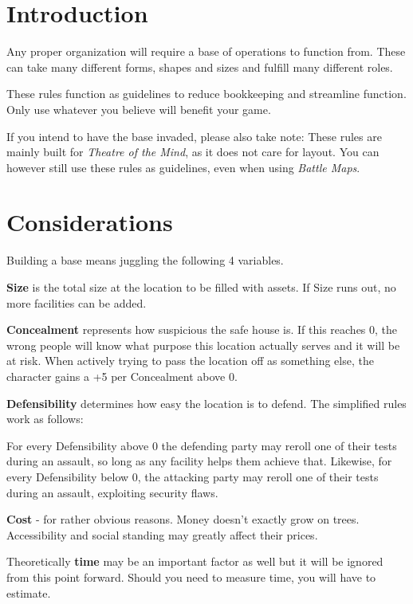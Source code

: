 \documentclass[12pt,a4paper,openany]{book}
\begin{document}
	

	\chapter{Introduction}
	Any proper organization will require a base of operations to function from. These can take many different forms, shapes and sizes and fulfill many different roles.
	\par
	These rules function as guidelines to reduce bookkeeping and streamline function. Only use whatever you believe will benefit your game.
	\par
	If you intend to have the base invaded, please also take note: These rules are mainly built for \emph{Theatre of the Mind}, as it does not care for layout. You can however still use these rules as guidelines, even when using \emph{Battle Maps}.

	\chapter{Considerations}
	Building a base means juggling the following 4 variables.\par
	\textbf{Size} is the total size at the location to be filled with assets. If Size runs out, no more facilities can be added.\par
	\textbf{Concealment} represents how suspicious the safe house is. If this reaches 0, the wrong people will know what purpose this location actually serves and it will be at risk.
	When actively trying to pass the location off as something else, the character gains a +5 per Concealment above 0.\par
	\textbf{Defensibility} determines how easy the location is to defend. The simplified rules work as follows: \par \vspace*{-10mm}
	\hspace{15mm}For every Defensibility above 0 the defending party may reroll one of their tests during an assault, so long as any facility helps them achieve that.
	Likewise, for every Defensibility below 0, the attacking party may reroll one of their tests during an assault, exploiting security flaws.\par
	\textbf{Cost} - for rather obvious reasons. Money doesn't exactly grow on trees. Accessibility and social standing may greatly affect their prices.\par
	Theoretically \textbf{time} may be an important factor as well but it will be ignored from this point forward. Should you need to measure time, you will have to estimate.
\end{document}

